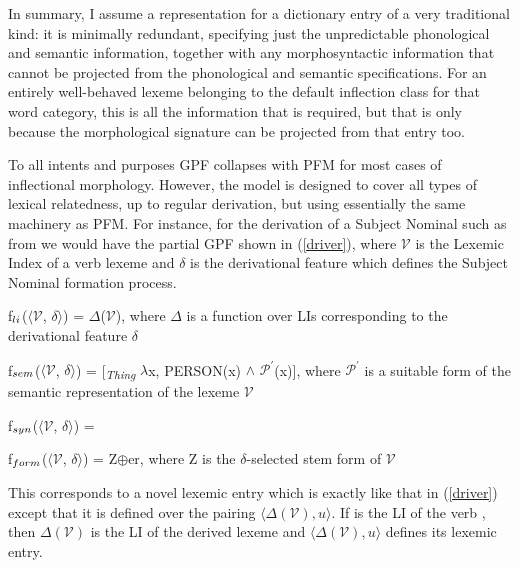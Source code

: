 \documentclass[output=paper,
modfonts
]{LSP/langsci}
\begin{document}
In summary, I assume a representation for a dictionary entry of a very traditional kind: it is minimally redundant, specifying just the unpredictable phonological and semantic information, together with any morphosyntactic information that cannot be projected from the phonological and semantic specifications. 
 For an entirely well-behaved lexeme belonging to the default inflection class for that word category, this is all the information that is required, but that is only because the morphological signature can be projected from that entry too. 


To all intents and purposes GPF collapses with PFM for most cases of inflectional morphology. However, the model is designed to cover all types of lexical relatedness, up to regular derivation, but using essentially the same machinery as PFM. For instance, for the derivation of a Subject Nominal such as  from  we would have the partial GPF shown in (\ref{driver}), where $\mathcal{V}$ is the Lexemic Index of a verb lexeme and $\delta$ is the derivational feature which defines the Subject Nominal formation process.

\noindent\begin{minipage}{\linewidth}
\begin{exe}
\ex	\label{driver}

	\begin{xlist}

\ex	f$\sb{li}$($\langle$$\mathcal{V}$, $\delta$$\rangle$) = $\Delta$($\mathcal{V}$), where $\Delta$ is a function over LIs corresponding to the derivational feature $\delta$

\ex	f$\sb{sem}$($\langle$$\mathcal{V}$, $\delta$$\rangle$) = 	 [\textsubscript{\textit{Thing}} $\lambda$x, PERSON(x) $\wedge$ $\mathcal{P}^{\prime}$(x)],  where $\mathcal{P}^{\prime}$ is a suitable form of the semantic representation of the lexeme $\mathcal{V}$
	
\ex	f$\sb{syn}$($\langle$$\mathcal{V}$, $\delta$$\rangle$) = 

	

\ex	f$\sb{form}$($\langle$$\mathcal{V}$, $\delta$$\rangle$) = Z$\oplus$er, where Z is the $\delta$-selected stem form of $\mathcal{V}$

	\end{xlist}
\end{exe}\end{minipage}\bigskip

\noindent
This corresponds to a novel lexemic entry which is exactly like that in (\ref{driver}) except that it is  defined over the pairing $\langle\Delta(\mathcal{V}),\textit{u}\rangle$. If  is the LI of the verb , then $\Delta(\mathcal{V})$ is the LI of the derived lexeme  and   $\langle\Delta(\mathcal{V}),\textit{u}\rangle$ defines its lexemic entry.
\end{document}
